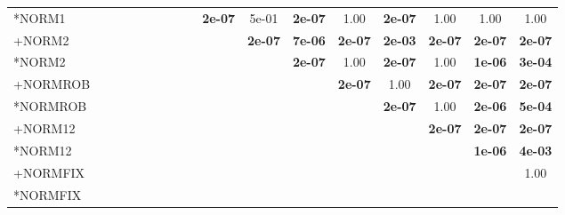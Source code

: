 \begin{table}[t]
{\begin{tabular}{lcccccccccccccccc}
*NORM1 &  &  &  &  &  &  &  &  & \textbf{2e-07} & 5e-01 & \textbf{2e-07} & 1.00 & \textbf{2e-07} & 1.00 & 1.00 & 1.00 \\
+NORM2 &  &  &  &  &  &  &  &  &  & \textbf{2e-07} & \textbf{7e-06} & \textbf{2e-07} & \textbf{2e-03} & \textbf{2e-07} & \textbf{2e-07} & \textbf{2e-07} \\
*NORM2 &  &  &  &  &  &  &  &  &  &  & \textbf{2e-07} & 1.00 & \textbf{2e-07} & 1.00 & \textbf{1e-06} & \textbf{3e-04} \\
+NORMROB &  &  &  &  &  &  &  &  &  &  &  & \textbf{2e-07} & 1.00 & \textbf{2e-07} & \textbf{2e-07} & \textbf{2e-07} \\
*NORMROB &  &  &  &  &  &  &  &  &  &  &  &  & \textbf{2e-07} & 1.00 & \textbf{2e-06} & \textbf{5e-04} \\
+NORM12 &  &  &  &  &  &  &  &  &  &  &  &  &  & \textbf{2e-07} & \textbf{2e-07} & \textbf{2e-07} \\
*NORM12 &  &  &  &  &  &  &  &  &  &  &  &  &  &  & \textbf{1e-06} & \textbf{4e-03} \\
+NORMFIX &  &  &  &  &  &  &  &  &  &  &  &  &  &  &  & 1.00 \\
*NORMFIX &  &  &  &  &  &  &  &  &  &  &  &  &  &  &  &  \\
\bottomrule
\end{tabular}
}
\end{table}

